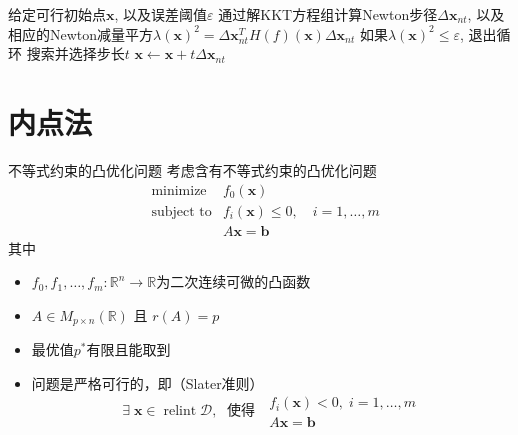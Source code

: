
\begin{frame}

\begin{algorithm}[H]
\SetAlgoLined
\DontPrintSemicolon
{}

给定可行初始点$\mathbf{x}$, 以及误差阈值$\varepsilon$ \;
{
通过解KKT方程组计算Newton步径$\Delta \mathbf{x}_{nt}$, 以及相应的Newton减量平方$\lambda(\mathbf{x})^2 = \Delta \mathbf{x}_{nt}^T H(f)(\mathbf{x}) \Delta \mathbf{x}_{nt}$\;
如果$\lambda(\mathbf{x})^2 \le \varepsilon$, 退出循环 \;
搜索并选择步长$t$ \;
$ \mathbf{x} \gets \mathbf{x} + t \Delta \mathbf{x}_{nt}$ \;
}
\caption{等式约束问题的Newton法}
\end{algorithm}

\end{frame}


\section{内点法}


\begin{frame}

\begin{block}{不等式约束的凸优化问题}
考虑含有不等式约束的凸优化问题
\begin{eqnarray*}
& \text{minimize} & f_0(\mathbf{x}) \\
& \text{subject to} & f_i(\mathbf{x}) \le 0, \quad i = 1,\ldots,m \\
& & A\mathbf{x} = \mathbf{b}
\end{eqnarray*}
其中
\begin{itemize}
\item $f_0,f_1,\ldots,f_m: \mathbb{R}^n \to \mathbb{R}$为二次连续可微的凸函数
\item $A \in M_{p\times n}(\mathbb{R})$ 且 $r(A) = p$
\item 最优值$p^*$有限且能取到
\item 问题是严格可行的，即（Slater准则）
\[\exists \; \mathbf{x} \in \operatorname{relint} \mathcal{D}, \; \text{ 使得 }\;
\begin{array}{l}
f_i(\mathbf{x}) < 0, \; i = 1,\ldots,m \\
A\mathbf{x} = \mathbf{b}
\end{array}\]
\end{itemize}
\end{block}

\end{frame}


